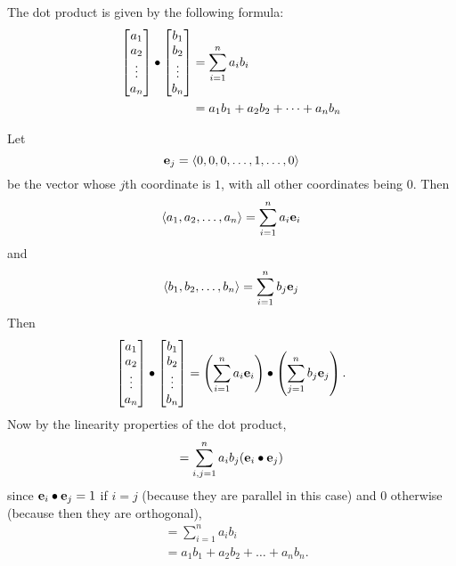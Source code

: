 \documentclass{ximera}
\begin{document}
\begin{theorem}
  The dot product is given by the following formula:
    \begin{align*}
  \begin{bmatrix}
    a_1\\
    a_2\\
    \vdots\\
    a_n
  \end{bmatrix}
  \bullet
  \begin{bmatrix}
    b_1\\
    b_2\\
    \vdots\\
    b_n
  \end{bmatrix}
  &= \sum_{i=1}^n a_ib_i\\
  &= a_1b_1 + a_2b_2 +\dots+a_nb_n
    \end{align*}
\begin{explanation}
  Let 
  \[
  \mathbf{e}_j = \left\langle 0,0,0,\dots,1,\dots,0\right\rangle
  \]	
  be the vector whose $j$th coordinate is $1$, with all other
  coordinates being $0$. Then
  \[ 
  \left\langle a_1,a_2, \dots,a_n\right\rangle = \sum_{i=1}^n a_i \mathbf{e}_i
  \]
  and
  \[ 
  \left\langle b_1,b_2, \dots,b_n\right\rangle = \sum_{i=1}^n b_j \mathbf{e}_j
  \]	 
    Then
    \[
    \begin{bmatrix}
      a_1\\
      a_2\\
      \vdots\\
      a_n
    \end{bmatrix}
    \bullet
    \begin{bmatrix}
      b_1\\
      b_2\\
      \vdots\\
      b_n
    \end{bmatrix} = \left(\sum_{i=1}^n a_i \mathbf{e}_i\right) \bullet \left(\sum_{j=1}^n b_j \mathbf{e}_j\right).
    \]
    Now by the linearity properties of the dot product,
    \[
    =\sum_{i,j =1}^n a_ib_j(\mathbf{e}_i \bullet \mathbf{e}_j)
    \]
    since $\mathbf{e}_i \bullet \mathbf{e}_j = 1$ if $i=j$ (because they are
    parallel in this case) and $0$ otherwise (because then they are
    orthogonal),
    \begin{align*}
    &=\sum_{i=1}^n a_ib_i \\
    &=a_1b_1 + a_2b_2 +\dots+a_nb_n.
    \end{align*}
\end{explanation}
\end{theorem}
\end{document}
